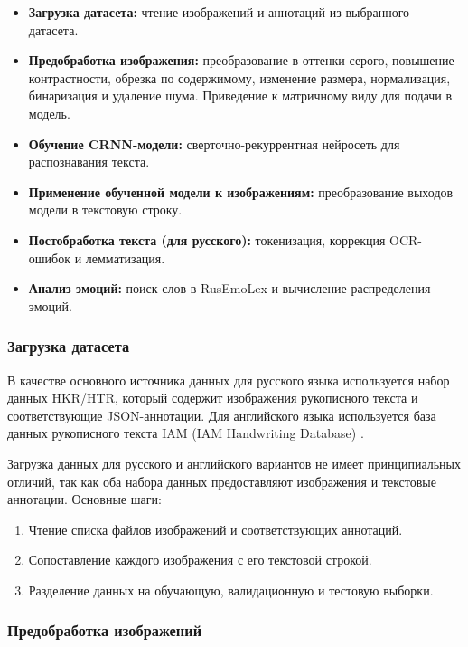 \documentclass[12pt,a4paper]{article}
\begin{document}
\begin{itemize}
    \item \textbf{Загрузка датасета:} чтение изображений и аннотаций из выбранного датасета.
    \item \textbf{Предобработка изображения:} преобразование в оттенки серого, повышение контрастности, обрезка по содержимому, изменение размера, нормализация, бинаризация и удаление шума. Приведение к матричному виду для подачи в модель.
    \item \textbf{Обучение CRNN-модели:} сверточно-рекуррентная нейросеть для распознавания текста.
    \item \textbf{Применение обученной модели к изображениям:} преобразование выходов модели в текстовую строку.
    \item \textbf{Постобработка текста (для русского):} токенизация, коррекция OCR-ошибок и лемматизация.
    \item \textbf{Анализ эмоций:} поиск слов в RusEmoLex и вычисление распределения эмоций.
\end{itemize}

\subsubsection{Загрузка датасета}

В качестве основного источника данных для русского языка используется набор данных HKR/HTR,
который содержит изображения рукописного текста и соответствующие JSON-аннотации.
Для английского языка используется база данных рукописного текста IAM (IAM Handwriting Database) \cite{marti2002iam}.

Загрузка данных для русского и английского вариантов не имеет принципиальных отличий,
так как оба набора данных предоставляют изображения и текстовые аннотации. Основные шаги:

\begin{enumerate}
    \item Чтение списка файлов изображений и соответствующих аннотаций.
    \item Сопоставление каждого изображения с его текстовой строкой.
    \item Разделение данных на обучающую, валидационную и тестовую выборки.
\end{enumerate}

\subsubsection{Предобработка изображений}
\end{document}

